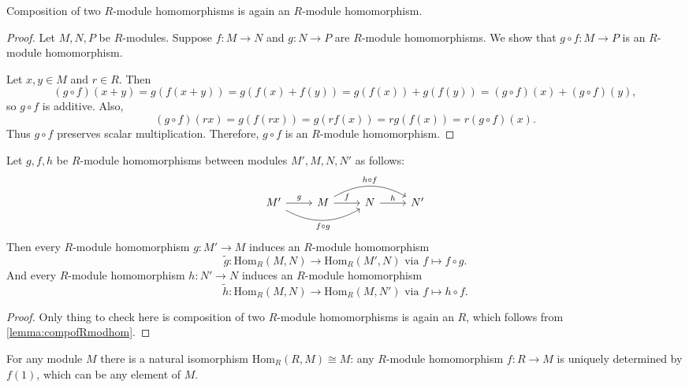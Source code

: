 \begin{lemma}\label{lemma:compofRmodhom}
    Composition of two \(R\)-module homomorphisms is again an  \(R\)-module homomorphism.
\end{lemma}
\begin{proof}
    Let $M,N,P$ be $R$-modules. 
Suppose $f : M \to N$ and $g : N \to P$ are $R$-module homomorphisms. 
We show that $g \circ f : M \to P$ is an $R$-module homomorphism.

Let $x,y \in M$ and $r \in R$. Then
\[
(g \circ f)(x+y)
= g(f(x+y))
= g(f(x)+f(y))
= g(f(x)) + g(f(y))
= (g \circ f)(x) + (g \circ f)(y),
\]
so $g \circ f$ is additive. Also,
\[
(g \circ f)(rx)
= g(f(rx))
= g(rf(x))
= r g(f(x))
= r (g \circ f)(x).
\]
Thus $g \circ f$ preserves scalar multiplication. Therefore, 
$g \circ f$ is an $R$-module homomorphism.
\end{proof}
\begin{proposition}
    Let \(g, f, h\) be  \(R\)-module homomorphisms between modules \(M', M, N, N'\) as follows:
\[\begin{tikzcd}
	{M'} & M & N & {N'}
	\arrow["g", from=1-1, to=1-2]
	\arrow["{f \circ g}"', bend right, from=1-1, to=1-3]
	\arrow["f", from=1-2, to=1-3]
	\arrow["{h \circ f}", bend left, from=1-2, to=1-4]
	\arrow["h", from=1-3, to=1-4]
\end{tikzcd}\]
Then every \(R\)-module homomorphism  \(g: M' \longrightarrow M\) induces an  \(R\)-module homomorphism 
 \[
     \tilde{g}: \text{Hom}_R(M, N) \longrightarrow \text{Hom}_R(M', N) \text{ via } f \mapsto f \circ g.
\] 
And every \(R\)-module homomorphism  \(h: N' \longrightarrow N\) induces an  \(R\)-module homomorphism 
 \[
     \tilde{h}: \text{Hom}_R(M, N) \longrightarrow \text{Hom}_R(M, N') \text{ via } f \mapsto h \circ f.
\] 
\end{proposition}
\begin{proof}
    Only thing to check here is composition of two \(R\)-module homomorphisms is again an  \(R\), which follows from \autoref{lemma:compofRmodhom}.
\end{proof}
\begin{remark}
    For any module \(M\) there is a natural isomorphism  \(\text{Hom}_R(R, M) \cong M\): any \(R\)-module homomorphism  \(f: R \longrightarrow M\) is uniquely determined by \(f(1)\), which can be any element of  \(M\).
\end{remark}
